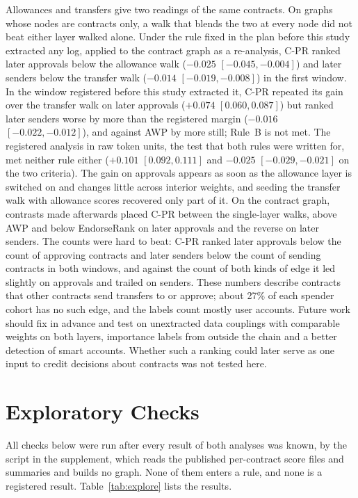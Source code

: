 \documentclass{ieeeaccess}
\newcommand{\cpr}{\mbox{C-PR}}
\begin{document}
Allowances and transfers give two readings of the same contracts. On graphs whose nodes are contracts only, a walk that blends the two at every node did not beat either layer walked alone. Under the rule fixed in the plan before this study extracted any log, applied to the contract graph as a re-analysis, \cpr{} ranked later approvals below the allowance walk ($-0.025$ $[-0.045,-0.004]$) and later senders below the transfer walk ($-0.014$ $[-0.019,-0.008]$) in the first window. In the window registered before this study extracted it, \cpr{} repeated its gain over the transfer walk on later approvals ($+0.074$ $[0.060,0.087]$) but ranked later senders worse by more than the registered margin ($-0.016$ $[-0.022,-0.012]$), and against AWP by more still; Rule~B is not met. The registered analysis in raw token units, the test that both rules were written for, met neither rule either ($+0.101$ $[0.092,0.111]$ and $-0.025$ $[-0.029,-0.021]$ on the two criteria). The gain on approvals appears as soon as the allowance layer is switched on and changes little across interior weights, and seeding the transfer walk with allowance scores recovered only part of it. On the contract graph, contrasts made afterwards placed \cpr{} between the single-layer walks, above AWP and below EndorseRank on later approvals and the reverse on later senders. The counts were hard to beat: \cpr{} ranked later approvals below the count of approving contracts and later senders below the count of sending contracts in both windows, and against the count of both kinds of edge it led slightly on approvals and trailed on senders. These numbers describe contracts that other contracts send transfers to or approve; about 27\% of each spender cohort has no such edge, and the labels count mostly user accounts. Future work should fix in advance and test on unextracted data couplings with comparable weights on both layers, importance labels from outside the chain and a better detection of smart accounts. Whether such a ranking could later serve as one input to credit decisions about contracts was not tested here.

\appendices
\section{Exploratory Checks}
\label{app:explore}

All checks below were run after every result of both analyses was known, by the script in the supplement, which reads the published per-contract score files and summaries and builds no graph. None of them enters a rule, and none is a registered result. Table~\ref{tab:explore} lists the results.
\end{document}
